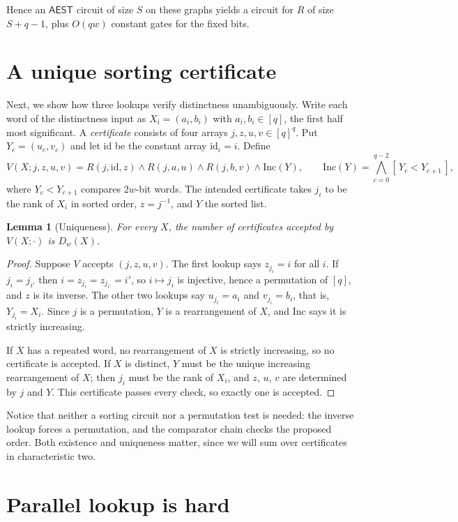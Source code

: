 \documentclass[11pt]{article}
\newtheorem{lemma}[theorem]{Lemma}
\theoremstyle{definition}
\theoremstyle{remark}
\newcommand{\AEST}{\mathsf{AEST}}
\newcommand{\Inc}{\mathrm{Inc}}
\newcommand{\id}{\mathrm{id}}
\newcommand{\ind}[1]{[\,#1\,]}
\begin{document}
Hence an $\AEST$ circuit of size $S$ on these graphs yields a circuit for
$R$ of size $S+q-1$, plus $O(qw)$ constant gates for the fixed bits.

\section{A unique sorting certificate}\label{sec:certificate}

Next, we show how three lookups verify distinctness unambiguously. Write
each word of the distinctness input as $X_i=(a_i,b_i)$ with
$a_i,b_i\in[q]$, the first half most significant. A \emph{certificate}
consists of four arrays $j,z,u,v\in[q]^q$. Put $Y_c=(u_c,v_c)$ and let
$\id$ be the constant array $\id_i=i$. Define
\[
V(X;j,z,u,v)=R(j,\id,z)\wedge R(j,a,u)\wedge R(j,b,v)\wedge
\Inc(Y),
\qquad
\Inc(Y)=\bigwedge_{c=0}^{q-2}\ind{Y_c<Y_{c+1}},
\]
where $Y_c<Y_{c+1}$ compares $2w$-bit words. The intended certificate
takes $j_i$ to be the rank of $X_i$ in sorted order, $z=j^{-1}$, and $Y$
the sorted list.

\begin{lemma}[Uniqueness]\label{lem:unique}
For every $X$, the number of certificates accepted by $V(X;\cdot)$ is
$D_w(X)$.
\end{lemma}
\begin{proof}
Suppose $V$ accepts $(j,z,u,v)$. The first lookup says $z_{j_i}=i$ for
all $i$. If $j_i=j_{i'}$ then $i=z_{j_i}=z_{j_{i'}}=i'$, so $i\mapsto j_i$
is injective, hence a permutation of $[q]$, and $z$ is its inverse. The
other two lookups say $u_{j_i}=a_i$ and $v_{j_i}=b_i$, that is,
$Y_{j_i}=X_i$. Since $j$ is a permutation, $Y$ is a rearrangement of $X$,
and $\Inc$ says it is strictly increasing.

If $X$ has a repeated word, no rearrangement of $X$ is strictly increasing,
so no certificate is accepted. If $X$ is distinct, $Y$ must be the unique
increasing rearrangement of $X$; then $j_i$ must be the rank of $X_i$, and
$z$, $u$, $v$ are determined by $j$ and $Y$. This certificate passes every
check, so exactly one is accepted.
\end{proof}

Notice that neither a sorting circuit nor a permutation test is needed:
the inverse lookup forces a permutation, and the comparator chain checks
the proposed order. Both existence and uniqueness matter, since we will
sum over certificates in characteristic two.

\section{Parallel lookup is hard}\label{sec:hardcore}
\end{document}
